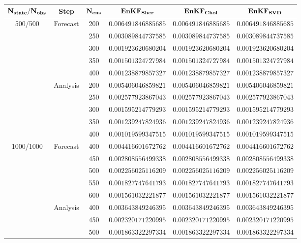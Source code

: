 \documentclass[12pt]{article}
\begin{document}
\begin{table}[H]
\centering
{\scriptsize
\begin{tabular}{|c|c|c|c|c|c|} \hline
${\bf N_{state}/N_{obs}}$ & {\bf Step} & $\bf N_{ens}$ & ${\bf EnKF_{Sher}}$ & ${\bf  EnKF_{Chol}}$ & ${\bf EnKF_{SVD}}$  \\ \hline
\multirow{10}{*}{500/500} & \multirow{5}{*}{Forecast}  & 200 & $0.006491846885685$ & $0.006491846885685$ & $0.006491846885685$  \\ 
&  & 250 & $0.003089844737585$ & $0.003089844737585$ & $0.003089844737585$ \\ 
&  & 300 & $ 0.001923620680204$ & $ 0.001923620680204$ & $ 0.001923620680204$  \\ 
&  & 350 & $0.001501324727984$ & $0.001501324727984$ & $0.001501324727984$  \\ 
&  & 400 & $0.001238879857327$ & $0.001238879857327$ & $0.001238879857327$ \\ \cline{2-6}
& \multirow{5}{*}{Analysis} &  200 & $0.005406046859821$ & $0.005406046859821$ & $0.005406046859821$  \\ 
& & 250 & $ 0.002577923867043$ & $ 0.002577923867043$ & $ 0.002577923867043$ \\ 
& & 300 & $0.001595214779293$ & $0.001595214779293$ & $0.001595214779293$  \\ 
& & 350 & $0.001239247824936$ & $0.001239247824936$ & $0.001239247824936$  \\ 
& & 400 & $0.001019599347515$ & $0.001019599347515$ & $0.001019599347515$ \\ \hline
\multirow{10}{*}{1000/1000} & \multirow{5}{*}{Forecast}  & 400 & $0.004416601672762$ & $0.004416601672762$ & $0.004416601672762$  \\ 
&  & 450 & $0.002808556499338$ & $0.002808556499338$ & $0.002808556499338$ \\ 
&  & 500 & $0.002256025116209$ & $0.002256025116209$ & $0.002256025116209$  \\ 
&  & 550 & $0.001827747641793$ & $0.001827747641793$ & $0.001827747641793$  \\ 
&  & 600 & $0.001561032221877$ & $0.001561032221877$ & $0.001561032221877$ \\ \cline{2-6}
& \multirow{5}{*}{Analysis} &  400 & $0.003643849246395$ & $0.003643849246395$ & $0.003643849246395$  \\ 
& & 450 & $0.002320171220995$ & $0.002320171220995$ & $0.002320171220995$ \\ 
& & 500 & $0.001863322297334$ & $0.001863322297334$ & $0.001863322297334$  \\ 

\end{tabular}}
\end{table}
\end{document}
